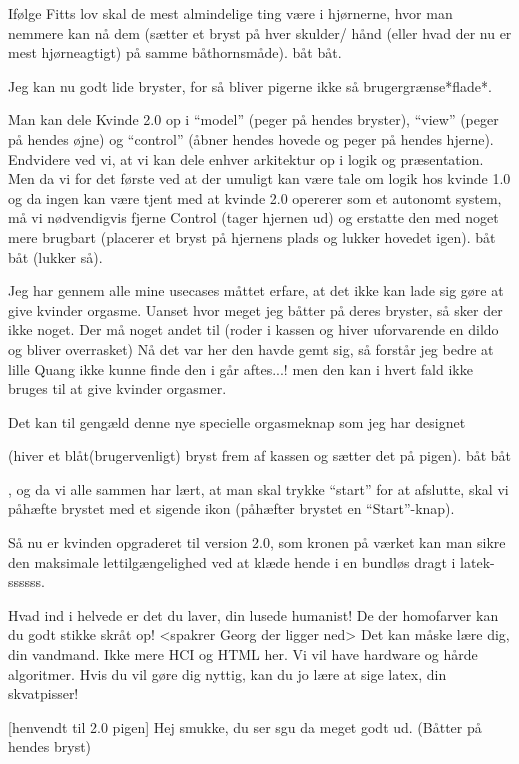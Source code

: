 \documentclass[a4paper,11pt]{article}
\begin{document}
\begin{sketch}
Ifølge Fitts lov skal de mest almindelige ting være i hjørnerne, hvor man nemmere kan nå dem (sætter et bryst på hver skulder/ hånd (eller hvad der nu er mest hjørneagtigt) på samme båthornsmåde). båt båt.

Jeg kan nu godt lide bryster, for så bliver pigerne ikke så brugergrænse*flade*.

Man kan dele Kvinde 2.0 op i ``model'' (peger på hendes bryster), ``view'' (peger på hendes øjne) og ``control'' (åbner hendes hovede og peger på hendes hjerne). Endvidere ved vi, at vi kan dele enhver arkitektur op i logik og præsentation. Men da vi for det første ved at der umuligt kan være tale om logik hos kvinde 1.0 og da ingen kan være tjent med at kvinde 2.0 opererer som et autonomt system, må vi nødvendigvis fjerne Control (tager hjernen ud) og erstatte den med noget mere brugbart (placerer et bryst på hjernens plads og lukker hovedet igen). båt båt (lukker så).

Jeg har gennem alle mine usecases måttet erfare, at det ikke kan lade sig gøre at give kvinder orgasme. Uanset hvor meget jeg båtter på deres bryster, så sker der ikke noget. Der må noget andet til (roder i kassen og hiver uforvarende en dildo og bliver overrasket) Nå det var her den havde gemt sig, så forstår jeg bedre at lille Quang ikke kunne finde den i går aftes...! men den kan i hvert fald ikke bruges til at give kvinder orgasmer.

Det kan til gengæld denne nye specielle orgasmeknap som jeg har designet

(hiver et blåt(brugervenligt) bryst frem af kassen og sætter det på pigen). båt båt

, og da vi alle sammen har lært, at man skal trykke ``start'' for at afslutte, skal vi påhæfte brystet med et sigende ikon (påhæfter brystet en ``Start''-knap).

Så nu er kvinden opgraderet til version 2.0, som kronen på værket kan man sikre den maksimale lettilgængelighed ved at klæde hende i en bundløs dragt i latek-ssssss.
 
 
 Hvad ind i helvede er det du laver, din lusede humanist! De der homofarver kan du godt stikke skråt op! <spakrer Georg der ligger ned> Det kan
måske lære dig, din vandmand. Ikke mere HCI og HTML her. Vi vil have hardware og hårde algoritmer. Hvis du vil gøre dig nyttig, kan du jo lære at sige latex, din skvatpisser!

[henvendt til 2.0 pigen] Hej smukke, du ser sgu da meget godt ud. (Båtter på hendes bryst)


\end{sketch}
\end{document}
